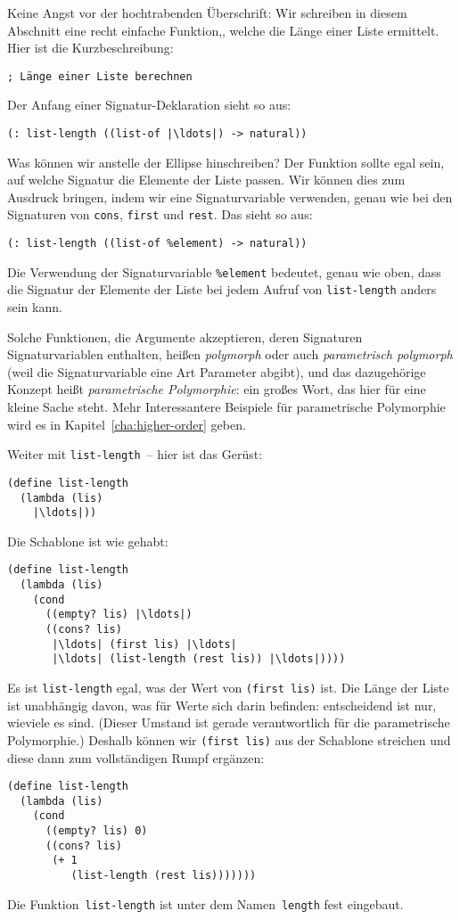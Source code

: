 %
Keine Angst vor der hochtrabenden Überschrift: Wir schreiben in diesem
Abschnitt eine recht einfache Funktion,, welche die Länge einer Liste
ermittelt. Hier ist die
Kurzbeschreibung:
%
\begin{lstlisting}
; Länge einer Liste berechnen
\end{lstlisting}
%
Der Anfang einer Signatur-Deklaration sieht so aus:
%
\begin{lstlisting}
(: list-length ((list-of |\ldots|) -> natural))
\end{lstlisting}
%
Was können wir anstelle der Ellipse hinschreiben?  Der Funktion sollte
egal sein, auf welche Signatur die Elemente der Liste passen. Wir
können dies zum Ausdruck bringen, indem wir eine Signaturvariable
verwenden, genau wie bei den Signaturen von \lstinline{cons},
\lstinline{first} und \lstinline{rest}.  Das sieht so aus:\label{page:list-length}
%
\begin{lstlisting}
(: list-length ((list-of %element) -> natural))
\end{lstlisting}
%
Die Verwendung der Signaturvariable \lstinline{%element} bedeutet,
genau wie oben, dass die Signatur der Elemente der Liste bei jedem
Aufruf von \lstinline{list-length} anders sein kann.

Solche Funktionen, die Argumente akzeptieren, deren Signaturen
Signaturvariablen enthalten, heißen \textit{polymorph} oder auch
\textit{parametrisch polymorph} (weil die Signaturvariable eine Art
Parameter abgibt), und das dazugehörige Konzept heißt
\textit{parametrische
  Polymorphie}:
ein großes Wort, das hier für eine kleine Sache steht.  Mehr Interessantere
Beispiele für parametrische Polymorphie wird es in
Kapitel~\ref{cha:higher-order} geben.

Weiter mit \texttt{list-length}~-- hier ist das Gerüst:
%
\begin{lstlisting}
(define list-length
  (lambda (lis)
    |\ldots|))
\end{lstlisting}
%
Die Schablone ist wie gehabt:
%
\begin{lstlisting}
(define list-length
  (lambda (lis)
    (cond
      ((empty? lis) |\ldots|)
      ((cons? lis) 
       |\ldots| (first lis) |\ldots|
       |\ldots| (list-length (rest lis)) |\ldots|))))
\end{lstlisting}
%
Es ist \texttt{list-length} egal, was der Wert von \texttt{(first
  lis)} ist.  Die Länge der Liste ist unabhängig davon, was für Werte
sich darin befinden: entscheidend ist nur, wieviele es sind.  (Dieser
Umstand ist gerade verantwortlich für die parametrische Polymorphie.)
Deshalb können wir \texttt{(first lis)} aus der Schablone streichen und
diese dann zum vollständigen Rumpf ergänzen:
%
\begin{lstlisting}
(define list-length
  (lambda (lis)
    (cond
      ((empty? lis) 0)
      ((cons? lis) 
       (+ 1 
          (list-length (rest lis)))))))
\end{lstlisting}
%
Die Funktion~\lstinline{list-length} ist unter dem
Namen~\lstinline{length} fest
eingebaut.\label{func:length}

